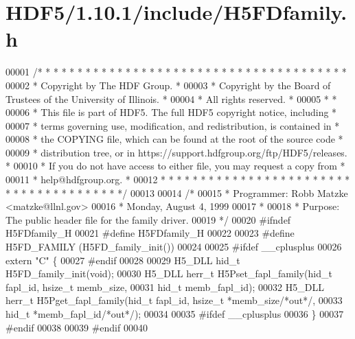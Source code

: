 \hypertarget{_h_d_f5_21_810_81_2include_2_h5_f_dfamily_8h_source}{}\section{H\+D\+F5/1.10.1/include/\+H5\+F\+Dfamily.h}
\label{_h_d_f5_21_810_81_2include_2_h5_f_dfamily_8h_source}

\begin{DoxyCode}
00001 \textcolor{comment}{/* * * * * * * * * * * * * * * * * * * * * * * * * * * * * * * * * * * * * * *}
00002 \textcolor{comment}{ * Copyright by The HDF Group.                                               *}
00003 \textcolor{comment}{ * Copyright by the Board of Trustees of the University of Illinois.         *}
00004 \textcolor{comment}{ * All rights reserved.                                                      *}
00005 \textcolor{comment}{ *                                                                           *}
00006 \textcolor{comment}{ * This file is part of HDF5.  The full HDF5 copyright notice, including     *}
00007 \textcolor{comment}{ * terms governing use, modification, and redistribution, is contained in    *}
00008 \textcolor{comment}{ * the COPYING file, which can be found at the root of the source code       *}
00009 \textcolor{comment}{ * distribution tree, or in https://support.hdfgroup.org/ftp/HDF5/releases.  *}
00010 \textcolor{comment}{ * If you do not have access to either file, you may request a copy from     *}
00011 \textcolor{comment}{ * help@hdfgroup.org.                                                        *}
00012 \textcolor{comment}{ * * * * * * * * * * * * * * * * * * * * * * * * * * * * * * * * * * * * * * */}
00013 
00014 \textcolor{comment}{/*}
00015 \textcolor{comment}{ * Programmer:  Robb Matzke <matzke@llnl.gov>}
00016 \textcolor{comment}{ *              Monday, August  4, 1999}
00017 \textcolor{comment}{ *}
00018 \textcolor{comment}{ * Purpose: The public header file for the family driver.}
00019 \textcolor{comment}{ */}
00020 \textcolor{preprocessor}{#ifndef H5FDfamily\_H}
00021 \textcolor{preprocessor}{#define H5FDfamily\_H}
00022 
00023 \textcolor{preprocessor}{#define H5FD\_FAMILY (H5FD\_family\_init())}
00024 
00025 \textcolor{preprocessor}{#ifdef \_\_cplusplus}
00026 \textcolor{keyword}{extern} \textcolor{stringliteral}{"C"} \{
00027 \textcolor{preprocessor}{#endif}
00028 
00029 H5\_DLL hid\_t H5FD\_family\_init(\textcolor{keywordtype}{void});
00030 H5\_DLL herr\_t H5Pset\_fapl\_family(hid\_t fapl\_id, hsize\_t memb\_size,
00031               hid\_t memb\_fapl\_id);
00032 H5\_DLL herr\_t H5Pget\_fapl\_family(hid\_t fapl\_id, hsize\_t *memb\_size\textcolor{comment}{/*out*/},
00033               hid\_t *memb\_fapl\_id\textcolor{comment}{/*out*/});
00034 
00035 \textcolor{preprocessor}{#ifdef \_\_cplusplus}
00036 \}
00037 \textcolor{preprocessor}{#endif}
00038 
00039 \textcolor{preprocessor}{#endif}
00040 
\end{DoxyCode}
